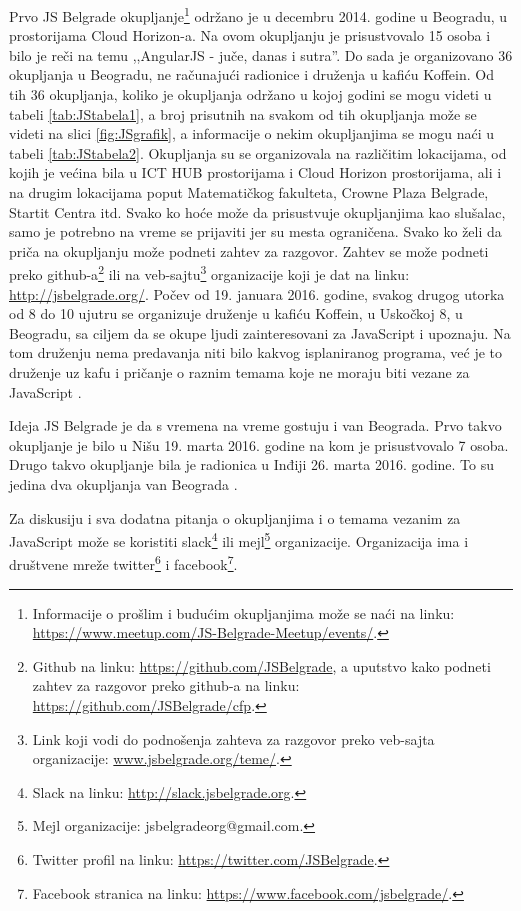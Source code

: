 \documentclass[a4paper]{article}
\begin{document}
{Prvo JS Belgrade okupljanje\footnote{Informacije o prošlim i budućim okupljanjima može se naći na linku: \url{https://www.meetup.com/JS-Belgrade-Meetup/events/}.} održano je u decembru 2014. godine u Beogradu, u prostorijama Cloud Horizon-a. Na ovom okupljanju je prisustvovalo 15 osoba i bilo je reči na temu ,,AngularJS - juče, danas i sutra''. Do sada je organizovano 36 okupljanja u Beogradu, ne računajući radionice i druženja u kafiću Koffein. Od tih 36 okupljanja, koliko je okupljanja održano u kojoj godini se mogu videti u tabeli \ref{tab:JStabela1}, a broj prisutnih na svakom od tih okupljanja može se videti na slici \ref{fig:JSgrafik}, a informacije o nekim okupljanjima se mogu naći u tabeli \ref{tab:JStabela2}. Okupljanja su se organizovala na različitim lokacijama, od kojih je većina bila u ICT HUB prostorijama \cite{aboutICT} i Cloud Horizon prostorijama, ali i na drugim lokacijama poput Matematičkog fakulteta, Crowne Plaza Belgrade, Startit Centra \cite{aboutStarit} itd. Svako ko hoće može da prisustvuje okupljanjima kao slušalac, samo je potrebno na vreme se prijaviti jer su mesta ograničena. Svako ko želi da priča na okupljanju može podneti zahtev za razgovor. Zahtev se može podneti preko github-a\footnote{Github na linku: \url{https://github.com/JSBelgrade}, a uputstvo kako podneti zahtev za razgovor preko github-a na linku: \url{https://github.com/JSBelgrade/cfp}.} ili na veb-sajtu\footnote{Link koji vodi do podnošenja zahteva za razgovor preko veb-sajta organizacije: \url{www.jsbelgrade.org/teme/}.} organizacije koji je dat na linku: \url{http://jsbelgrade.org/}. Počev od 19. januara 2016. godine, svakog drugog utorka od 8 do 10 ujutru  se organizuje druženje u kafiću Koffein, u Uskočkoj 8, u Beogradu, sa ciljem da se okupe ljudi zainteresovani za JavaScript i upoznaju. Na tom druženju nema predavanja niti bilo kakvog isplaniranog programa, već je to druženje uz kafu i pričanje o raznim temama koje ne moraju biti vezane za JavaScript \cite{JS_Belgrade_meetup_pocetna}.

Ideja JS Belgrade je da s vremena na vreme gostuju i van Beograda. Prvo takvo okupljanje je bilo u Nišu 19. marta 2016. godine na kom je prisustvovalo 7 osoba. Drugo takvo okupljanje bila je radionica u Inđiji 26. marta 2016. godine. To su jedina dva okupljanja van Beograda \cite{JS_Belgrade_meetup_pocetna}.

Za diskusiju i sva dodatna pitanja o okupljanjima i o temama vezanim za JavaScript može se koristiti slack\footnote{Slack na linku: \url{http://slack.jsbelgrade.org}.} ili mejl\footnote{Mejl organizacije: jsbelgradeorg@gmail.com.} organizacije. Organizacija ima i društvene mreže twitter\footnote{Twitter profil na linku: \url{https://twitter.com/JSBelgrade}.} i facebook\footnote{Facebook stranica na linku: \url{https://www.facebook.com/jsbelgrade/}.}.

}
\end{document}
